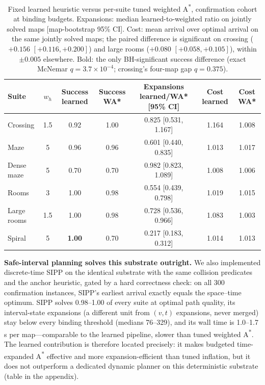 \documentclass[letterpaper]{article} %
\begin{document}
\begin{table}[t]
\centering
\small
\begin{tabular}{lcccccc}
\toprule
Suite & $w_h$ & Success learned & Success WA* & Expansions learned/WA* [95\% CI] & Cost learned & Cost WA* \\
\midrule
Crossing & 1.5 & 0.92 & 1.00 & 0.825 [0.531, 1.167] & 1.164 & 1.008 \\
Maze & 5 & 0.96 & 0.96 & 0.601 [0.440, 0.835] & 1.013 & 1.017 \\
Dense maze & 5 & 0.70 & 0.70 & 0.982 [0.823, 1.089] & 1.008 & 1.006 \\
Rooms & 3 & 1.00 & 0.98 & 0.554 [0.439, 0.798] & 1.019 & 1.015 \\
Large rooms & 1.5 & 1.00 & 0.98 & 0.728 [0.536, 0.966] & 1.083 & 1.003 \\
Spiral & 5 & \textbf{1.00} & 0.70 & 0.217 [0.183, 0.312] & 1.014 & 1.013 \\
\bottomrule
\end{tabular}
\caption{Fixed learned heuristic versus per-suite tuned weighted A\textsuperscript{*}, confirmation cohort at binding budgets. Expansions: median learned-to-weighted ratio on jointly solved maps [map-bootstrap 95\% CI]. Cost: mean arrival over optimal arrival on the same jointly solved maps; the paired difference is significant on crossing ($+0.156$ $[+0.116, +0.200]$) and large rooms ($+0.080$ $[+0.058, +0.105]$), within $\pm 0.005$ elsewhere. Bold: the only BH-significant success difference (exact McNemar $q{=}3.7\times10^{-4}$; crossing's four-map gap $q{=}0.375$).}
\label{tab:wastar-main}
\end{table}

\textbf{Safe-interval planning solves this substrate outright.} We also implemented discrete-time SIPP \citep{phillips2011sipp} on the identical substrate with the same collision predicates and the anchor heuristic, gated by a hard correctness check: on all 300 confirmation instances, SIPP's earliest arrival exactly equals the space--time optimum. SIPP solves 0.98--1.00 of every suite at optimal path quality, its interval-state expansions (a different unit from $(v,t)$ expansions, never merged) stay below every binding threshold (medians 76--329), and its wall time is 1.0--1.7\,s per map---comparable to the learned pipeline, slower than tuned weighted A\textsuperscript{*}. The learned contribution is therefore located precisely: it makes budgeted time-expanded A\textsuperscript{*} effective and more expansion-efficient than tuned inflation, but it does not outperform a dedicated dynamic planner on this deterministic substrate (table in the appendix).
\end{document}
